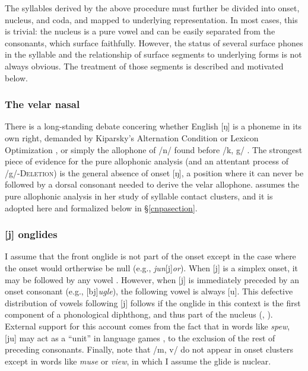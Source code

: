 
The syllables derived by the above procedure must further be divided into onset, nucleus, and coda, and mapped to underlying representation. In most cases, this is trivial: the nucleus is a pure vowel and can be easily separated from the consonants, which surface faithfully. However, the status of several surface phones in the syllable and the relationship of surface segments to underlying forms is not always obvious. The treatment of those segments is described and motivated below. 

\subsubsection{The velar nasal}
\label{velarnasal}

There is a long-standing debate concering whether English [ŋ] is a phoneme in its own right, demanded by Kiparsky's Alternation Condition \citep{Kiparsky1968} or Lexicon Optimization \citep[][53]{OT}, or simply the allophone of /n/ found before /k, g/ \citep[][65]{Borowsky1986}. The strongest piece of evidence for the pure allophonic analysis (and an attentant process of /g/-\textsc{Deletion}) is the general absence of onset [ŋ], a position where it can never be followed by a dorsal consonant needed to derive the velar allophone. \citet{Pierrehumbert1994} assumes the pure allophonic analysis in her study of syllable contact clusters, and it is adopted here and formalized below in \S\ref{cnpasection}.

\subsubsection{[j] onglides}

I assume that the front onglide is not part of the onset except in the case where the onset would ortherwise be null (e.g., \emph{jun}[j]\emph{or}). %
When [j] is a simplex onset, it may be followed by any vowel \citep[][276]{Borowsky1986}. However, when [j] is immediately preceded by an onset consonant (e.g., [bj]\emph{ugle}), the following vowel is always [u\lm]. This defective distribution of vowels following [j] follows if the onglide in this context is the first component of a phonological diphthong, and thus part of the nucleus (\citealp[][232]{Hayes1980}, \citealp[][61f.]{Harris1994}). External support for this account comes from the fact that in words like \emph{spew}, [ju\lm] may act as a ``unit'' in language games \citep{Nevins2003,Idsardi2005}, to the exclusion of the rest of preceding consonants. Finally, \citet[][42]{Clements1983} note 
that /m, v/ do not appear in onset clusters except in words like \emph{muse} or \emph{view}, in which I assume the glide is nuclear. 

